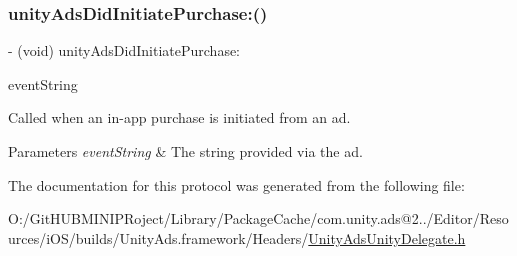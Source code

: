 \subsubsection{\texorpdfstring{unityAdsDidInitiatePurchase:()}{unityAdsDidInitiatePurchase:()}}
{\footnotesize\ttfamily -\/ (void) unity\+Ads\+Did\+Initiate\+Purchase\+: \begin{DoxyParamCaption}\item[{(N\+S\+String $\ast$)}]{event\+String }\end{DoxyParamCaption}}

Called when an in-\/app purchase is initiated from an ad.


\begin{DoxyParams}{Parameters}
{\em event\+String} & The string provided via the ad. \\
\hline
\end{DoxyParams}


The documentation for this protocol was generated from the following file\+:\begin{DoxyCompactItemize}
\item 
O\+:/\+Git\+H\+U\+B\+M\+I\+N\+I\+P\+Roject/\+Library/\+Package\+Cache/com.\+unity.\+ads@2../\+Editor/\+Resources/i\+O\+S/builds/\+Unity\+Ads.\+framework/\+Headers/\mbox{\hyperlink{_unity_ads_unity_delegate_8h}{Unity\+Ads\+Unity\+Delegate.\+h}}\end{DoxyCompactItemize}
